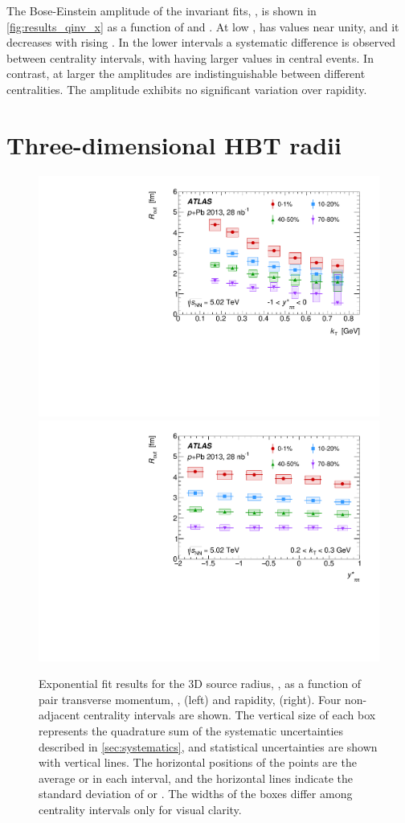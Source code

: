 The Bose-Einstein amplitude of the invariant fits, \linv, is shown in \cref{fig:results_qinv_x} as a function of \kt and \kys.
At low \kt, \linv has values near unity, and it decreases with rising \kt.
In the lower \kt intervals a systematic difference is observed between centrality intervals, with \linv having larger values in central events.
In contrast, at larger \kt the amplitudes are indistinguishable between different centralities.
The amplitude exhibits no significant variation over rapidity.

\FloatBarrier
\section{Three-dimensional HBT radii}
\label{sec:3d_results}

\begin{figure}[t]
\centering
\includegraphics[width=.49\linewidth]{canqosl_Rout_vs_kt.pdf}
\includegraphics[width=.49\linewidth]{canqosl_Rout_vs_kys.pdf}
\caption{Exponential fit results for the 3D source radius, \Rout, as a function of pair transverse momentum, \kt, (left) and rapidity, \kys (right). Four non-adjacent centrality intervals are shown. The vertical size of each box represents the quadrature sum of the systematic uncertainties described in \cref{sec:systematics}, and statistical uncertainties are shown with vertical lines. The horizontal positions of the points are the average \kt or \kys in each interval, and the horizontal lines indicate the standard deviation of \kt or \kys. The widths of the boxes differ among centrality intervals only for visual clarity.}
\label{fig:results_Rout}
\end{figure}

